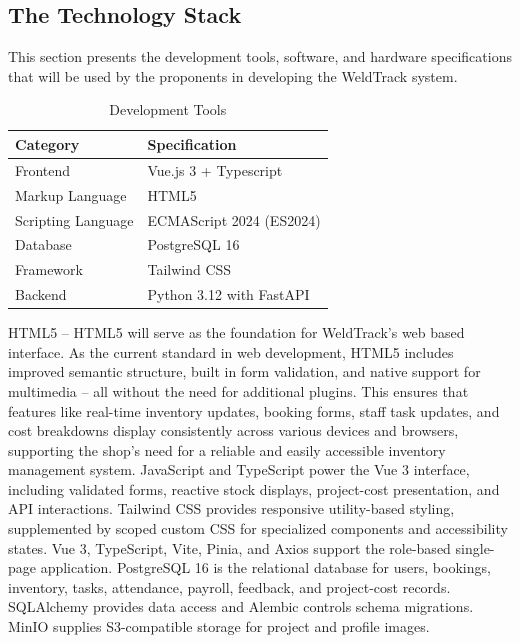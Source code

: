 \documentclass[12pt, letterpaper]{article}
\begin{document}
\subsection{The Technology Stack}
\hspace*{2em} This section presents the development tools, software, and hardware specifications that will be used by the proponents in developing the WeldTrack system.

\begin{table}[h]
\centering
\caption{Development Tools}
\begin{tabular}{p{6cm} p{6cm}}
\toprule
\textbf{Category} & \textbf{Specification} \\
\midrule
Frontend            & Vue.js 3 + Typescript \\
                   Markup Language            & HTML5 \\
Scripting Language         & ECMAScript 2024 (ES2024) \\
                   Database              & PostgreSQL 16 \\
Framework               & Tailwind CSS \\
                   Backend & Python 3.12 with FastAPI \\
                   
\bottomrule
\end{tabular}
\end{table}
\hspace*{2em}HTML5 – HTML5 will serve as the foundation for WeldTrack's web based interface. As the current standard in web development, HTML5 includes improved semantic structure, built in form validation, and native support for multimedia – all without the need for additional plugins. This ensures that features like real-time inventory updates, booking forms, staff task updates, and cost breakdowns display consistently across various devices and browsers, supporting the shop's need for a reliable and easily accessible inventory management system.
\hspace*{2em} JavaScript and TypeScript power the Vue 3 interface, including validated forms, reactive stock displays, project-cost presentation, and API interactions.
\hspace*{2em} Tailwind CSS provides responsive utility-based styling, supplemented by scoped custom CSS for specialized components and accessibility states. Vue 3, TypeScript, Vite, Pinia, and Axios support the role-based single-page application.
\hspace*{2em} PostgreSQL 16 is the relational database for users, bookings, inventory, tasks, attendance, payroll, feedback, and project-cost records. SQLAlchemy provides data access and Alembic controls schema migrations. MinIO supplies S3-compatible storage for project and profile images.
\end{document}
